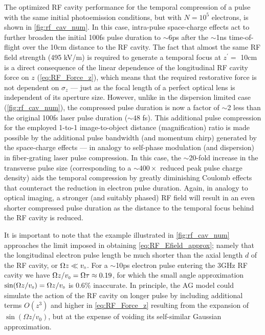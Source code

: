 The optimized RF cavity performance for the temporal compression of a pulse with the same initial photoemission conditions, but with $N = 10^{5}$ electrons, is shown in \ref{fig:rf_cav_num}.
In this case, intra-pulse space-charge effects act to further broaden the initial 100fs pulse duration to $\sim$6ps after the $\sim$1ns time-of-flight over the 10cm distance to the RF cavity.
The fact that almost the same RF field strength (495 kV/m) is required to generate a temporal focus at $z^{\prime} = $ 10cm is a direct consequence of the linear dependence of the longitudinal RF cavity force on $z$ (\ref{eq:RF_Force_z}), which means that the required restorative force is not dependent on $\sigma_{z}$ --- just as the focal length of a perfect optical lens is independent of its aperture size.
However, unlike in the dispersion limited case (\ref{fig:rf_cav_num}), the compressed pulse duration is now a factor of $\sim$2 less than the original 100fs laser pulse duration ($\sim 48$ fs).
This additional pulse compression for the employed 1-to-1 image-to-object distance (magnification) ratio is made possible by the additional pulse bandwidth (and momentum chirp) generated by the space-charge effects --- in analogy to self-phase modulation (and dispersion) in fiber-grating laser pulse compression.\cite{strickland_compression_1985}
In this case, the $\sim$20-fold increase in the transverse pulse size (corresponding to a $\sim400\times$ reduced peak pulse charge density) aids the temporal compression by greatly diminishing Coulomb effects that counteract the reduction in electron pulse duration.
Again, in analogy to optical imaging, a stronger (and suitably phased) RF field will result in an even shorter compressed pulse duration as the distance to the temporal focus behind the RF cavity is reduced.

It is important to note that the example illustrated in \ref{fig:rf_cav_num} approaches the limit imposed in obtaining \ref{eq:RF_Efield_approx}; namely that the longitudinal electron pulse length be much shorter than the axial length $d$ of the RF cavity, or $ \Omega z \ll v_{{\scriptscriptstyle 0}} $.
For a $\sim$10ps electron pulse entering the 3GHz RF cavity we have $ \Omega z / v_{{\scriptscriptstyle 0}} = \Omega \tau \approx 0.19 $, for which the small angle approximation $ \sin ( \Omega z / v_{{\scriptscriptstyle 0}} ) = \Omega z / v_{{\scriptscriptstyle 0}} $ is 0.6\% inaccurate.
In principle, the AG model could simulate the action of the RF cavity on longer pulse by including additional terms $O \left ( z^{3} \right )$ and higher in \ref{eq:RF_Force_z} resulting from the expansion of $ \sin \left ( \Omega z / v_{0} \right ) $, but at the expense of voiding its self-similar Gaussian approximation.

